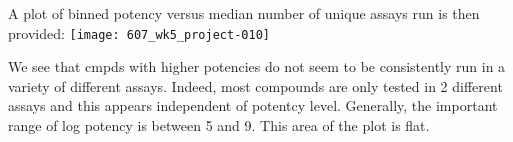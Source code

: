 \documentclass{article}
\begin{document}
A plot of binned potency versus median number of unique assays run is then provided:
\texttt{[image: 607\_wk5\_project-010]}

We see that cmpds with higher potencies do not seem to be consistently run in a variety of different assays.  Indeed, most compounds are only tested in 2 different assays and this appears independent of potentcy level.  Generally, the important range of log potency is between 5 and 9.  This area of the plot is flat.
\end{document}
